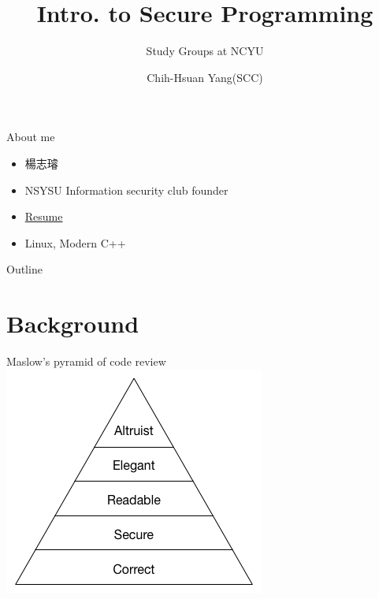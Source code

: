 \documentclass{beamer}
\begin{document}
\begin{CJK*}{UTF8}{bsmi}

    \title{Intro. to Secure Programming}
    \subtitle{Study Groups at NCYU}
    \author{Chih-Hsuan Yang(SCC)}

    \begin{frame}
        \titlepage
    \end{frame}

    \begin{frame}{About me}
        \begin{itemize}
            \item 楊志璿
            \item NSYSU Information security club founder
            \item \href{https://github.com/25077667/Resume/blob/main/resume/resume.pdf}{Resume}
            \item Linux, Modern C++
        \end{itemize}
    \end{frame}

    \begin{frame}{Outline}
        \tableofcontents
    \end{frame}

    \section{Background}
    \begin{frame}{Maslow’s pyramid of code review}
        \centering\includegraphics[height=.9\textheight]{Maslow.png}
    \end{frame}


\end{CJK*}
\end{document}
